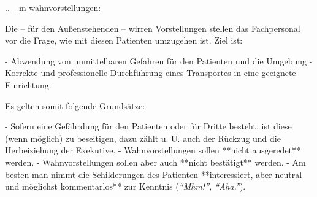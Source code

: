 
.. _m-wahnvorstellungen:


Die -- für
den Außenstehenden -- wirren Vorstellungen stellen das Fachpersonal vor die Frage, wie mit diesen
Patienten umzugehen ist.
Ziel ist:
\begin{enumerate}
  -   Abwendung von unmittelbaren Gefahren für den
  Patienten und die Umgebung
  -   Korrekte und professionelle Durchführung eines
  Transportes in eine geeignete Einrichtung.
\end{enumerate}
Es gelten somit folgende Grundsätze:
\begin{enumerate}
  -   Sofern eine Gefährdung für den Patienten oder für
  Dritte besteht, ist diese (wenn möglich) zu beseitigen,
  dazu zählt u. U. auch der Rückzug und die Herbeiziehung
  der Exekutive.
  -   Wahnvorstellungen sollen **nicht ausgeredet**
  werden.
  -    Wahnvorstellungen sollen aber auch **nicht
  bestätigt** werden.
  -   Am besten man nimmt die Schilderungen des
  Patienten **interessiert, aber neutral und möglichst
  kommentarlos** zur Kenntnis (\emph{\enquote{Mhm!}, \enquote{Aha.}}).
\end{enumerate}